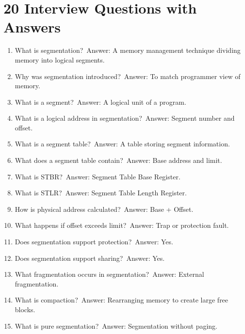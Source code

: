 \section{20 Interview Questions with Answers}

\begin{enumerate}
\item What is segmentation?\
Answer: A memory management technique dividing memory into logical segments.

\item Why was segmentation introduced?\
Answer: To match programmer view of memory.

\item What is a segment?\
Answer: A logical unit of a program.

\item What is a logical address in segmentation?\
Answer: Segment number and offset.

\item What is a segment table?\
Answer: A table storing segment information.

\item What does a segment table contain?\
Answer: Base address and limit.

\item What is STBR?\
Answer: Segment Table Base Register.

\item What is STLR?\
Answer: Segment Table Length Register.

\item How is physical address calculated?\
Answer: Base + Offset.

\item What happens if offset exceeds limit?\
Answer: Trap or protection fault.

\item Does segmentation support protection?\
Answer: Yes.

\item Does segmentation support sharing?\
Answer: Yes.

\item What fragmentation occurs in segmentation?\
Answer: External fragmentation.

\item What is compaction?\
Answer: Rearranging memory to create large free blocks.

\item What is pure segmentation?\
Answer: Segmentation without paging.


\end{enumerate}
